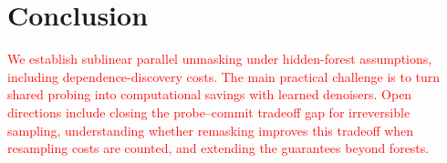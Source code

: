 \section{Conclusion}
\label{sec:conclusion}

\textcolor{red}{We establish sublinear parallel unmasking under hidden-forest
assumptions, including dependence-discovery costs. The main practical
challenge is to turn shared probing into computational savings with learned
denoisers. Open directions include closing the probe--commit tradeoff gap
for irreversible sampling, understanding whether remasking improves this
tradeoff when resampling costs are counted, and extending the guarantees
beyond forests.}
